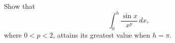 Show that
\[
\int_{0}^{h} \frac{\sin x}{x^{p}}\, dx,
\]
where $0 < p < 2$, attains its greatest value
when $h = \pi$. 

